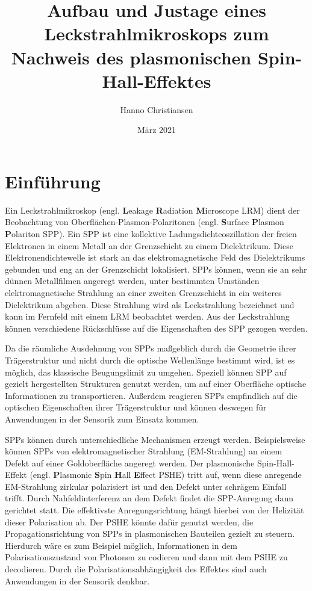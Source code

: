 \documentclass[a4paper, titlepage,  ngerman, fullpage]{book}
\title{Aufbau und Justage eines Leckstrahlmikroskops zum Nachweis des plasmonischen Spin-Hall-Effektes}
\author{Hanno Christiansen}
\date{März 2021}
\begin{document}
	
	\sloppy
	\frontmatter
	
	\thispagestyle{empty}

	\tableofcontents
	\mainmatter
	\chapter{Einführung}
	Ein Leckstrahlmikroskop (engl. \textbf{L}eakage \textbf{R}adiation \textbf{M}icroscope LRM) dient der Beobachtung von Oberflächen-Plasmon-Polaritonen (engl. \textbf{S}urface \textbf{P}lasmon \textbf{P}olariton SPP). Ein SPP ist eine kollektive Ladungsdichteoszillation der freien Elektronen in einem Metall an der Grenzschicht zu einem Dielektrikum. Diese Elektronendichtewelle ist stark an das elektromagnetische Feld des Dielektrikums gebunden und eng an der Grenzschicht lokalisiert. SPPs können, wenn sie an sehr dünnen Metallfilmen angeregt werden, unter bestimmten Umständen elektromagnetische Strahlung an einer zweiten Grenzschicht in ein weiteres Dielektrikum abgeben. Diese Strahlung wird als Leckstrahlung bezeichnet und kann im Fernfeld mit einem LRM beobachtet werden. Aus der Leckstrahlung können verschiedene Rückschlüsse auf die Eigenschaften des SPP gezogen werden.\cite{Drezet.2008}
	
	Da die räumliche Ausdehnung von SPPs maßgeblich durch die Geometrie ihrer Trägerstruktur und nicht durch die optische Wellenlänge bestimmt wird, ist es möglich, das klassische Beugungslimit zu umgehen. Speziell können SPP auf gezielt hergestellten Strukturen genutzt werden, um auf einer Oberfläche optische Informationen zu transportieren. Außerdem reagieren SPPs empfindlich auf die optischen Eigenschaften ihrer Trägerstruktur und können deswegen für Anwendungen in der Sensorik zum Einsatz kommen.\cite{Lin.2013}
	
	SPPs können durch unterschiedliche Mechanismen erzeugt werden. Beispielsweise können SPPs von elektromagnetischer Strahlung (EM-Strahlung) an einem Defekt auf einer Goldoberfläche angeregt werden. Der plasmonische Spin-Hall-Effekt (engl. \textbf{P}lasmonic \textbf{S}pin \textbf{H}all \textbf{E}ffect PSHE) tritt auf, wenn diese anregende EM-Strahlung zirkular polarisiert ist und den Defekt unter schrägem Einfall trifft. Durch Nahfeldinterferenz an dem Defekt findet die SPP-Anregung dann gerichtet statt. Die effektivste Anregungsrichtung hängt hierbei von der Helizität dieser Polarisation ab. Der PSHE könnte dafür genutzt werden, die Propagationsrichtung von SPPs in plasmonischen Bauteilen gezielt zu steuern. Hierdurch wäre es zum Beispiel möglich, Informationen in dem Polarisationszustand von Photonen zu codieren und dann mit dem PSHE zu decodieren. Durch die Polarisationsabhängigkeit des Effektes sind auch Anwendungen in der Sensorik denkbar.\cite{RodriguezFortuno.2013}
	
\end{document}
